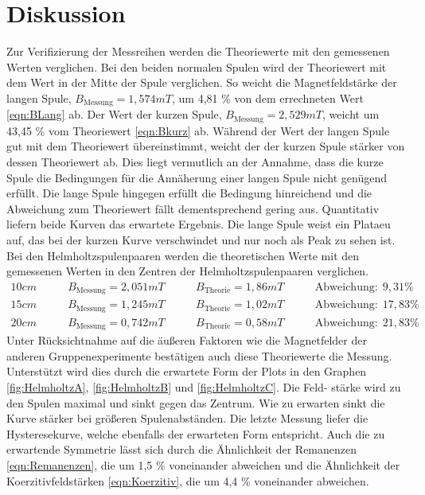 \documentclass[titlepage = firstcover]{scrartcl}
\begin{document}
    \section{Diskussion}
            Zur Verifizierung der Messreihen werden die Theoriewerte mit den gemessenen Werten verglichen. Bei den beiden normalen Spulen wird der Theoriewert mit
            dem Wert in der Mitte der Spule verglichen. So weicht die Magnetfeldstärke der langen Spule, \newline 
            $B_{\text{Messung}} = 1,574 mT$,  um 4,81 \% von dem errechneten Wert 
            \ref{eqn:BLang} ab. Der Wert der kurzen Spule, $B_{\text{Messung}} = 2,529 mT$, weicht um 43,45 \% vom Theoriewert \ref{eqn:Bkurz} ab. Während der Wert
            der langen Spule gut mit dem Theoriewert übereinstimmt, weicht der der kurzen Spule stärker von dessen Theoriewert ab. Dies liegt vermutlich an der 
            Annahme, dass die kurze Spule die Bedingungen für die Annäherung einer langen Spule nicht genügend erfüllt. Die lange Spule hingegen erfüllt die 
            Bedingung hinreichend und die Abweichung zum Theoriewert fällt dementsprechend gering aus. Quantitativ liefern 
            beide Kurven das erwartete Ergebnis. Die lange Spule weist ein Plataeu auf, das bei der kurzen Kurve verschwindet und nur noch als Peak zu sehen ist.
            Bei den Helmholtzspulenpaaren werden die theoretischen Werte mit den gemessenen Werten in den Zentren der Helmholtzspulenpaaren verglichen.
            \begin{align*}
                10cm& \qquad B_{\text{Messung}} = 2,051 mT& \qquad B_{\text{Theorie}} = 1,86 mT& \qquad \text{Abweichung}: \; 9,31 \% \\
                15cm& \qquad B_{\text{Messung}} = 1,245 mT& \qquad B_{\text{Theorie}} = 1,02 mT& \qquad \text{Abweichung}: \; 17,83 \% \\
                20cm& \qquad B_{\text{Messung}} = 0,742 mT& \qquad B_{\text{Theorie}} = 0,58 mT& \qquad \text{Abweichung}: \; 21,83 \% 
            \end{align*}
            Unter Rücksichtnahme auf die äußeren Faktoren wie die Magnetfelder der anderen Gruppenexperimente bestätigen auch diese Theoriewerte die Messung.
            Unterstützt wird dies durch die erwartete Form der Plots in den Graphen \ref{fig:HelmholtzA}, \ref{fig:HelmholtzB} und \ref{fig:HelmholtzC}. Die Feld-
            stärke wird zu den Spulen maximal und sinkt gegen das Zentrum. Wie zu erwarten sinkt die Kurve stärker bei größeren Spulenabständen.
            Die letzte Messung liefer die Hysteresekurve, welche ebenfalls der erwarteten Form entspricht. Auch die zu erwartende Symmetrie lässt sich durch die 
            Ähnlichkeit der Remanenzen \ref{eqn:Remanenzen}, die um 1,5 \% voneinander abweichen und die Ähnlichkeit der Koerzitivfeldstärken \ref{eqn:Koerzitiv},
            die um 4,4 \% voneinander abweichen. 
    
\end{document}

